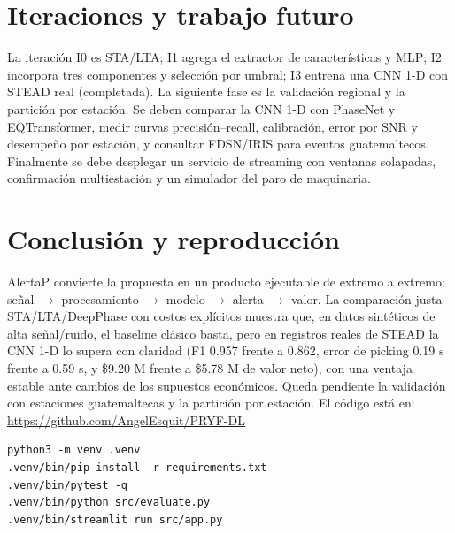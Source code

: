 \documentclass[11pt,letterpaper]{article}
\begin{document}
\section{Iteraciones y trabajo futuro}
La iteración I0 es STA/LTA; I1 agrega el extractor de características y MLP;
I2 incorpora tres componentes y selección por umbral; I3 entrena una CNN 1-D con
STEAD real (completada). La siguiente fase es la validación regional y la
partición por estación. Se deben comparar la CNN 1-D con PhaseNet y EQTransformer, medir curvas precisión--recall,
calibración, error por SNR y desempeño por estación, y consultar FDSN/IRIS para
eventos guatemaltecos. Finalmente se debe desplegar un servicio de streaming con
ventanas solapadas, confirmación multiestación y un simulador del paro de
maquinaria.

\section{Conclusión y reproducción}
AlertaP convierte la propuesta en un producto ejecutable de extremo a extremo:
señal $\rightarrow$ procesamiento $\rightarrow$ modelo $\rightarrow$ alerta
$\rightarrow$ valor. La comparación justa STA/LTA/DeepPhase con costos explícitos
muestra que, en datos sintéticos de alta señal/ruido, el baseline clásico basta,
pero en registros reales de STEAD la CNN 1-D lo supera con claridad (F1 0.957 frente
a 0.862, error de picking 0.19 s frente a 0.59 s, y \$9.20 M frente a \$5.78 M de
valor neto), con una ventaja estable ante cambios de los supuestos económicos.
Queda pendiente la validación con estaciones guatemaltecas y la partición por
estación. El código está en:
\url{https://github.com/AngelEsquit/PRYF-DL}

\begin{lstlisting}
python3 -m venv .venv
.venv/bin/pip install -r requirements.txt
.venv/bin/pytest -q
.venv/bin/python src/evaluate.py
.venv/bin/streamlit run src/app.py
\end{lstlisting}
\end{document}

